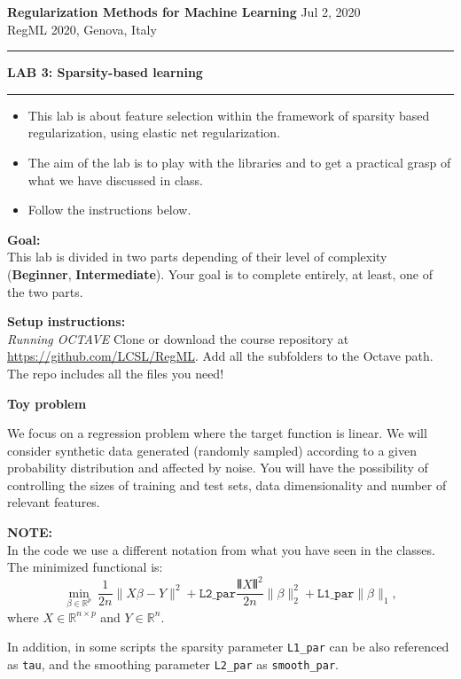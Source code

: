 \documentclass[DIN, pagenumber=false, fontsize=11pt, parskip=half]{scrartcl}
\newcommand{\mytitle}[1]{{\noindent\LARGE\textbf{#1}}}
\newcommand{\mysection}[1]{\noindent\large\textbf{#1}}
\begin{document}
\noindent\textbf{Regularization Methods for Machine Learning} \hfill Jul 2, 2020\\
RegML 2020, Genova, Italy \\ \rule{\textwidth}{1pt}

\mytitle{LAB 3: Sparsity-based learning}\\
\rule{\textwidth}{1pt}
\begin{itemize}\itemsep1pt \parskip0pt 
  \item This lab is about feature selection within the framework of sparsity based regularization, using elastic net regularization.
  \item The aim of the lab is to play with the libraries and to get a practical grasp of what we have discussed in class.
  \item Follow the instructions below.
\end{itemize}

\begin{framed}
\textbf{\textbf{Goal}:} \\
This lab is divided in two parts depending of their level of complexity (\textbf{Beginner}, \textbf{Intermediate}). Your goal is to complete entirely, at least, one of the two parts.
\end{framed}

\begin{framed}
\textbf{\textbf{Setup instructions}:} \\
\textit{Running OCTAVE}
Clone or download the course repository at \url{https://github.com/LCSL/RegML}. Add all the subfolders to the Octave path. The repo includes all the files you need!
\end{framed}

\mysection{Toy problem}

We focus on a regression problem where the target function is linear. We will consider synthetic data generated (randomly sampled) according to a given probability distribution and affected by noise. You will have the possibility of controlling the sizes of training and test sets, data dimensionality and number of relevant features.

\begin{framed}
\textbf{NOTE:} \\
In the code we use a different notation from what you have seen in the classes. The minimized functional is:
\begin{equation*}
\min_{\beta\in \mathbb{R}^p} \  \frac{1}{2n} \|X\beta-Y\|^2 +
\texttt{L2\_par} \frac{\VERT X \VERT^2}{2n}\|\beta\|^2_2 +
\texttt{L1\_par}\|\beta\|_1 ,
\end{equation*}
where $X \in \mathbb{R}^{n \times p}$ and $Y \in \mathbb{R}^n$.

In addition, in some  scripts the sparsity parameter \texttt{L1\_par} can be also referenced as \texttt{tau}, and the smoothing parameter \texttt{L2\_par} as \texttt{smooth\_par}.
\end{framed}
\end{document}
